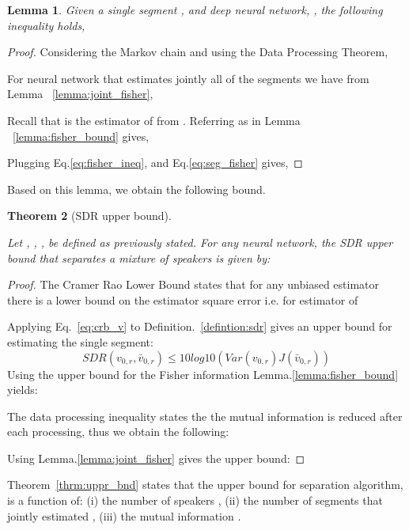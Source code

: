 \documentclass[a4paper]{article}
\theoremstyle{plain}
\newtheorem{theorem}{Theorem}[section]
\newtheorem{lemma}[theorem]{Lemma}
\theoremstyle{definition}
\theoremstyle{remark}
\begin{document}
\begin{lemma}
Given a single segment , and deep neural network, , the following inequality holds,

\end{lemma}
\begin{proof}

Considering the Markov chain  and using the Data Processing Theorem,

For neural network  that estimates jointly all of the segments we have from Lemma ~\ref{lemma:joint_fisher},

Recall that  is the estimator of  from . Referring  as  in Lemma ~\ref{lemma:fisher_bound} gives,

Plugging Eq.\ref{eq:fisher_ineq}, and Eq.\ref{eq:seg_fisher} gives,

\end{proof}

Based on this lemma, we obtain the following bound.
\begin{theorem}[SDR upper bound]
\label{thm:main}

Let , , ,  be defined as previously stated.
For any neural network, the SDR upper bound that separates a mixture of  speakers is given by:

\label{thrm:uppr_bnd}
\end{theorem}
\begin{proof}

The Cramer Rao Lower Bound \cite{Rao1992} states that for any unbiased estimator there is a lower bound on the estimator square error i.e. for estimator of 


Applying Eq.~\ref{eq:crb_v} to Definition.~\ref{defintion:sdr} gives an upper bound for estimating the single segment:
\begin{dmath}
    SDR(v_{0,r},\bar{v}_{0,r}) \leq 10log10(Var(v_{0,r})J(\bar{v}_{0,r}))
    \label{sdr_term}
\end{dmath}
Using the upper bound for the Fisher information Lemma.\ref{lemma:fisher_bound} yields:

The data processing inequality states the the mutual information is reduced after each processing, thus we obtain
the following:

Using Lemma.\ref{lemma:joint_fisher} gives the upper bound:


\end{proof}
Theorem~\ref{thrm:uppr_bnd} states that the upper bound for separation algorithm, is a function of: (i) the number of speakers , (ii) the number of segments that jointly estimated , (iii) the mutual information . 
\end{document}
